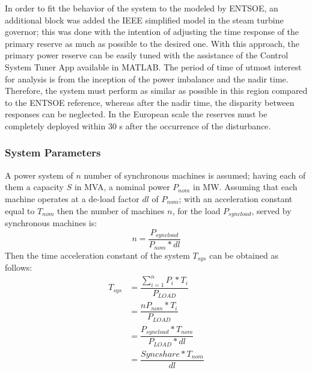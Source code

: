 In order to fit the behavior of the system to the modeled by ENTSOE, an additional block was added the IEEE simplified model in the steam turbine governor; this was done with the intention of adjusting the time response of the primary reserve as much as possible to the desired one. With this approach, the primary power reserve can be easily tuned with the assistance of the Control System Tuner App available in MATLAB. The period of time of utmost interest for analysis is from the inception of the power imbalance and the nadir time. Therefore, the system must perform as similar as possible in this region compared to the ENTSOE reference, whereas after the nadir time, the disparity between responses can be neglected. In the European scale the reserves must be completely deployed within 30 s after the occurrence of the disturbance.






\subsubsection{System Parameters}

A power system of $ n $ number of synchronous machines is assumed; having each of them a capacity $ S $ in MVA, a nominal power $ P_{nom} $ in MW.
Assuming that each machine operates at a de-load factor $ dl $ of $ P_{nom} $; with an acceleration constant equal to $ T_{nom} $ then the number of machines $ n $, for the load $ P_{syncload} $, served by synchronous machines is:
\begin{equation}
	n=\dfrac{P_{syncload}}{P_{nom}*dl}
\end{equation}
Then the time acceleration constant of the system $ T_{sys} $ can be obtained as follows:
\begin{align}
	T_{sys} &=\dfrac{\sum_{i=1}^nP_i*T_i}{P_{LOAD}}\nonumber  \\
	 &=\dfrac{nP_{nom}*T_i}{P_{LOAD}}\nonumber \\
	&=\dfrac{P_{syncload}*T_{nom}}{P_{LOAD}*dl}\nonumber\\
		&=\dfrac{Sync share*T_{nom}}{dl} \label{eq:tsyseuro}
\end{align}




